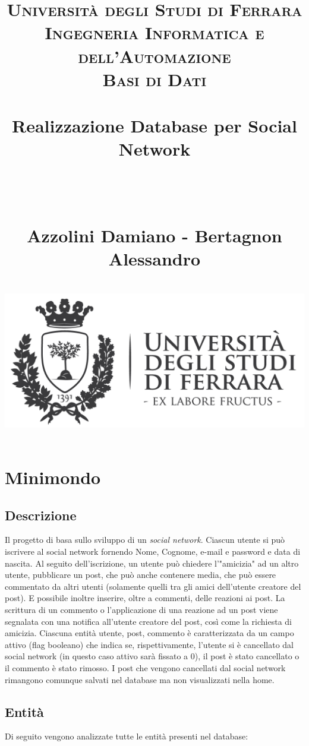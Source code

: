 \documentclass[paper=a4, fontsize=11pt,x11names]{report}
\title{
		\usefont{OT1}{bch}{b}{n}
		\normalfont \normalsize \textsc{Universit\`a degli Studi di Ferrara \\ Ingegneria Informatica e dell'Automazione
			\\ Basi di Dati} \\ [25pt]
		\horrule{0.5pt} \\[0.4cm]
		\Huge Realizzazione Database per Social Network \date{}\\%
		\horrule{0.5pt} \\[0.4cm]
		\LARGE Azzolini Damiano - Bertagnon Alessandro \\ [0.4cm]
		\horrule{2pt} \\[0.8cm]
		\includegraphics{logoUnife}
}
\begin{document}
\maketitle

\newpage

\tableofcontents
\thispagestyle{empty}

\listoffigures
\thispagestyle{empty}


\newpage





\chapter{Minimondo}
\section{Descrizione}
Il progetto di basa sullo sviluppo di un \textit{social network}. Ciascun utente si può iscrivere al social network
fornendo Nome, Cognome, e-mail e password e data di nascita. Al seguito dell'iscrizione, un utente può chiedere l'"amicizia" ad 
un altro utente, pubblicare un
post, che può anche contenere media, che può essere commentato da altri utenti (solamente quelli tra gli amici dell'utente creatore del post). E possibile inoltre inserire, oltre a commenti, delle reazioni ai post. 
La scrittura di un commento o l'applicazione di una reazione ad un post viene segnalata con una notifica all'utente creatore del post, così come la richiesta di amicizia. Ciascuna entità utente, post, commento è caratterizzata da un campo attivo (flag booleano) che indica se, rispettivamente, l'utente si è cancellato dal social network (in questo caso attivo sarà fissato a 0), il post è stato cancellato o il commento è stato rimosso. I post che vengono cancellati dal social network rimangono comunque salvati nel database ma non visualizzati nella home.

\section{Entità}
Di seguito vengono analizzate tutte le entità presenti nel database:
\end{document}
